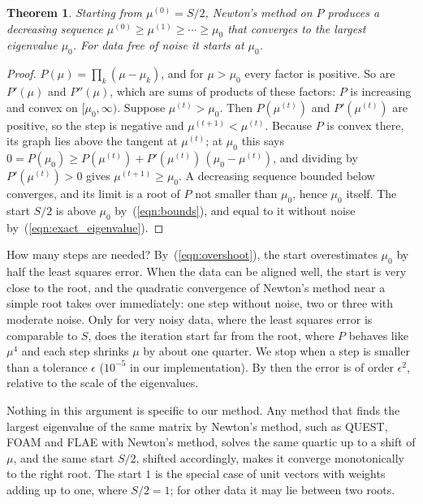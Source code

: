 \documentclass{birkjour}
\newtheorem{thm}{Theorem}[section]
\theoremstyle{definition}
\theoremstyle{remark}
\numberwithin{equation}{section}
\begin{document}
\begin{thm}
\label{thm:newton}
Starting from $\mu^{(0)} = S/2$, Newton's method on $P$ produces a decreasing sequence $\mu^{(0)} \geq \mu^{(1)} \geq \cdots \geq \mu_0$ that converges to the largest eigenvalue $\mu_0$. For data free of noise it starts at $\mu_0$.
\end{thm}
\begin{proof}
$P(\mu) = \prod_k (\mu - \mu_k)$, and for $\mu > \mu_0$ every factor is positive. So are $P'(\mu)$ and $P''(\mu)$, which are sums of products of these factors: $P$ is increasing and convex on $[\mu_0, \infty)$. Suppose $\mu^{(t)} > \mu_0$. Then $P(\mu^{(t)})$ and $P'(\mu^{(t)})$ are positive, so the step is negative and $\mu^{(t+1)} < \mu^{(t)}$. Because $P$ is convex there, its graph lies above the tangent at $\mu^{(t)}$; at $\mu_0$ this says $0 = P(\mu_0) \geq P(\mu^{(t)}) + P'(\mu^{(t)})\, (\mu_0 - \mu^{(t)})$, and dividing by $P'(\mu^{(t)}) > 0$ gives $\mu^{(t+1)} \geq \mu_0$. A decreasing sequence bounded below converges, and its limit is a root of $P$ not smaller than $\mu_0$, hence $\mu_0$ itself. The start $S/2$ is above $\mu_0$ by~(\ref{eqn:bounds}), and equal to it without noise by~(\ref{eqn:exact_eigenvalue}).
\end{proof}

How many steps are needed? By~(\ref{eqn:overshoot}), the start overestimates $\mu_0$ by half the least squares error. When the data can be aligned well, the start is very close to the root, and the quadratic convergence of Newton's method near a simple root takes over immediately: one step without noise, two or three with moderate noise. Only for very noisy data, where the least squares error is comparable to $S$, does the iteration start far from the root, where $P$ behaves like $\mu^4$ and each step shrinks $\mu$ by about one quarter. We stop when a step is smaller than a tolerance $\epsilon$ ($10^{-5}$ in our implementation). By then the error is of order $\epsilon^2$, relative to the scale of the eigenvalues.

Nothing in this argument is specific to our method. Any method that finds the largest eigenvalue of the same matrix by Newton's method, such as QUEST, FOAM and FLAE with Newton's method, solves the same quartic up to a shift of $\mu$, and the same start $S/2$, shifted accordingly, makes it converge monotonically to the right root. The start $1$ is the special case of unit vectors with weights adding up to one, where $S/2 = 1$; for other data it may lie between two roots.
\end{document}
